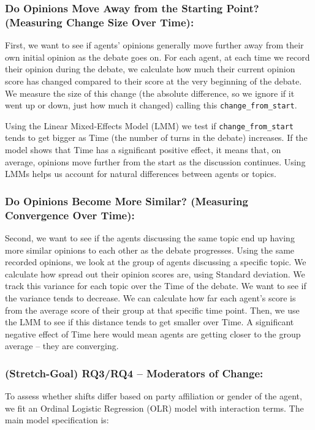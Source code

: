 \documentclass[12pt]{article}
\begin{document}
\begin{multicols}{2}
\subsubsection{Do Opinions Move Away from the Starting Point? (Measuring Change Size Over Time):}
First, we want to see if agents' opinions generally move further away from their own initial opinion as the debate goes on. For each agent, at each time we record their opinion during the debate, we calculate how much their current opinion score has changed compared to their score at the very beginning of the debate. We measure the size of this change (the absolute difference, so we ignore if it went up or down, just how much it changed) calling this \texttt{change\_from\_start}.


Using the Linear Mixed-Effects Model (LMM) we test if \texttt{change\_from\_start} tends to get bigger as Time (the number of turns in the debate) increases. If the model shows that Time has a significant positive effect, it means that, on average, opinions move further from the start as the discussion continues. Using LMMs helps us account for natural differences between agents or topics. 

\subsubsection{Do Opinions Become More Similar? (Measuring Convergence Over Time):}

Second, we want to see if the agents discussing the same topic end up having more similar opinions to each other as the debate progresses. Using the same recorded opinions, we look at the group of agents discussing a specific topic. We calculate how spread out their opinion scores are, using Standard deviation. We track this variance for each topic over the Time of the debate. We want to see if the variance tends to decrease. We can calculate how far each agent's score is from the average score of their group at that specific time point. Then, we use the LMM to see if this distance tends to get smaller over Time. A significant negative effect of Time here would mean agents are getting closer to the group average – they are converging.

\subsubsection{(Stretch-Goal) RQ3/RQ4 – Moderators of Change:}
To assess whether shifts differ based on party affiliation or gender of the agent, we fit an Ordinal Logistic Regression (OLR) model with interaction terms. The main model specification is:


\end{multicols}
\end{document}
